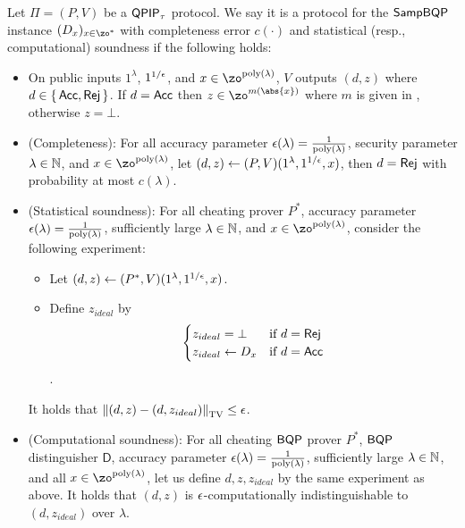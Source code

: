\begin{definition}
    \label{dfn:stats-secure-proto-sampbqp}
    Let $\Pi=(P, V)$ be a $\operatorname{\mathsf{QPIP}}_\tau$ protocol.
    We say it is a protocol for the $\operatorname{\mathsf{SampBQP}}$ instance $(D_x)_{x\in\zo^*}$ with completeness error $c(\cdot)$ and statistical (resp., computational) soundness if the following holds:
    \begin{itemize}
        \item On public inputs $1^\lambda$, $1^{1/\epsilon}$, and $x\in\zo^{\poly(\lambda)}$, $V$ outputs $(d, z)$ where $d\in\set{\mathsf{Acc}, \mathsf{Rej}}$.
            If $d=\mathsf{Acc}$ then $z\in\zo^{m(\abs{x})}$ where $m$ is given in , otherwise $z=\bot$.
        \item (Completeness):
            For all accuracy parameter $\epsilon(\lambda)=\frac{1}{\operatorname*{\operatorname{poly}}(\lambda)}$,
            security parameter $\lambda\in\mathbb{N}$,
            and $x\in\zo^{\poly(\lambda)}$,
            let $(d, z)\leftarrow(P, V)(1^\lambda, 1^{1/\epsilon}, x)$, then $d=\mathsf{Rej}$ with probability at most $c(\lambda)$.
        \item (Statistical soundness): For all cheating prover $P^*$,
            accuracy parameter $\epsilon(\lambda)=\frac{1}{\operatorname*{\operatorname{poly}}(\lambda)}$,
            sufficiently large $\lambda\in\mathbb{N}$, and $x\in\zo^{\poly(\lambda)}$,
            consider the following experiment:
            \begin{itemize}
                \item Let $(d, z)\leftarrow(P^*, V)(1^\lambda, 1^{1/\epsilon}, x)$.
                \item Define $z_{ideal}$ by
                $$\begin{cases}
                    z_{ideal}=\bot & \text{if } d=\mathsf{Rej}\\
                    z_{ideal}\leftarrow D_x & \text{if } d=\mathsf{Acc}
                \end{cases}$$.
            \end{itemize}
            It holds that $\left\lVert(d,z)-(d,z_{ideal})\right\rVert_{\mathrm{TV}}\leq\epsilon$.
		\item (Computational soundness):
        For all cheating $\operatorname{\mathsf{BQP}}$ prover $P^*$, $\operatorname{\mathsf{BQP}}$ distinguisher $\mathsf{D}$, accuracy parameter $\epsilon(\lambda)=\frac{1}{\operatorname*{\operatorname{poly}}(\lambda)}$,
            sufficiently large $\lambda\in\mathbb{N}$, and all $x\in\zo^{\poly(\lambda)}$,
            let us define $d, z, z_{ideal}$ by the same experiment as above.
            It holds that $(d, z)$ is $\epsilon$-computationally indistinguishable to $(d, z_{ideal})$ over $\lambda$.
    \end{itemize}
\end{definition}

